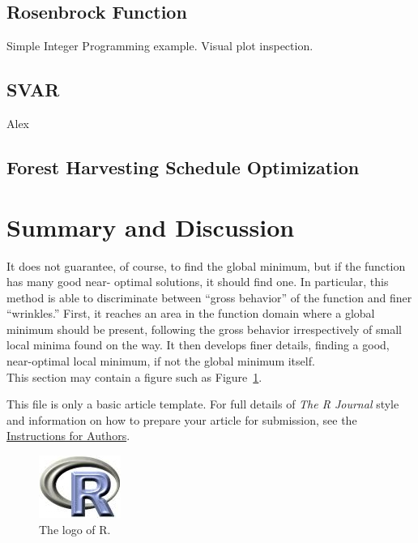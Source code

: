 \subsection{Rosenbrock Function}
Simple Integer Programming example. Visual plot inspection.
\subsection{SVAR}
Alex
\subsection{Forest Harvesting Schedule Optimization}
\section{Summary and Discussion}
It does not guarantee, of course, to find the global minimum, but if the function has many good near- optimal solutions, it should find one. In particular, this method is able to discriminate between “gross behavior” of the function and finer “wrinkles.” First, it reaches an area in the function domain where a global minimum should be present, following the gross behavior irrespectively of small local minima found on the way. It then develops finer details, finding a good, near-optimal local minimum, if not the global minimum itself.\\

This section may contain a figure such as Figure~\ref{figure:rlogo}.


This file is only a basic article template. For full details of \emph{The R Journal} style and information on how to prepare your article for submission, see the \href{http://journal.r-project.org/share/author-guide.pdf}{Instructions for Authors}.

\begin{figure}[htbp]
	\centering
	\includegraphics{Fig/Rlogo}
	\caption{The logo of R.}
	\label{figure:rlogo}
\end{figure}



\address{Author One\\
  Affiliation\\
  Address\\
  Country\\}

\address{Author Two\\
  Affiliation\\
  Address\\
  Country\\}

\address{Author Three\\
  Affiliation\\
  Address\\
  Country\\}
